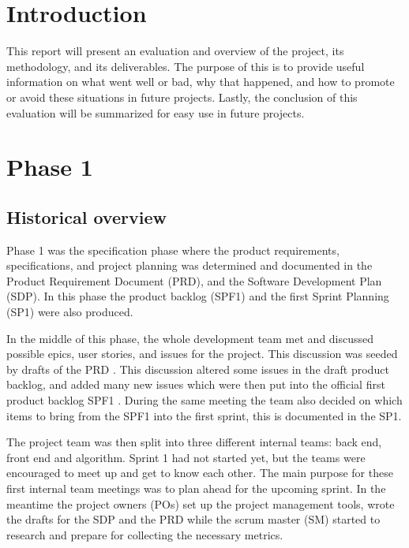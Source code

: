 \documentclass{article}
\begin{document}
\section{Introduction}
This report will present an evaluation and overview of the project, its methodology, and its deliverables. The purpose of this is to provide useful information on what went well or bad, why that happened, and how to promote or avoid these situations in future projects. Lastly, the conclusion of this evaluation will be summarized for easy use in future projects.

\section{Phase 1}
\subsection{Historical overview}

Phase 1 was the specification phase where the product requirements, specifications, and project planning was determined and documented in the Product Requirement Document (PRD)\cite{PRD}, and the Software Development Plan (SDP)\cite{SDP}. In this phase the product backlog (SPF1)\cite{SPF1} and the first Sprint Planning (SP1)\cite{SP1} were also produced. 

In the middle of this phase, the whole development team met and discussed possible epics, user stories, and issues for the project. This discussion was seeded by drafts of the PRD \cite{PRD}. This discussion altered some issues in the draft product backlog, and added many new issues which were then put into the official first product backlog SPF1 \cite{SPF1}. During the same meeting the team also decided on which items to bring from the SPF1 into the first sprint, this is documented in the SP1\cite{SP1}. 

The project team was then split into three different internal teams: back end, front end and algorithm. Sprint 1 had not started yet, but the teams were encouraged to meet up and get to know each other. The main purpose for these first internal team meetings was to plan ahead for the upcoming sprint. In the meantime the project owners (POs) set up the project management tools, wrote the drafts for the SDP and the PRD while the scrum master (SM) started to research and prepare for collecting the necessary metrics.
\end{document}
